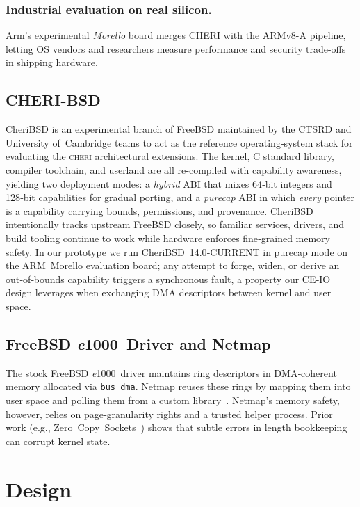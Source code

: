\documentclass[sigconf]{acmart}
\newcommand{\cheri}{\textsc{cheri}\xspace}
\newcommand{\e}{\textit{e}1000\xspace}
\begin{document}
\subsubsection{Industrial evaluation on real silicon.}
Arm’s experimental \textit{Morello} board merges CHERI with the ARMv8-A pipeline, letting OS vendors and researchers measure performance and security trade-offs in shipping hardware.






\subsection{CHERI-BSD}
CheriBSD is an experimental branch of FreeBSD maintained by the CTSRD and University of Cambridge teams to act as the reference operating‑system stack for evaluating the \cheri architectural extensions. The kernel, C standard library, compiler toolchain, and userland are all re‑compiled with capability awareness, yielding two deployment modes: a \emph{hybrid} ABI that mixes 64‑bit integers and 128‑bit capabilities for gradual porting, and a \emph{purecap} ABI in which \emph{every} pointer is a capability carrying bounds, permissions, and provenance. CheriBSD intentionally tracks upstream FreeBSD closely, so familiar services, drivers, and build tooling continue to work while hardware enforces fine‑grained memory safety. In our prototype we run CheriBSD 14.0‑CURRENT in purecap mode on the ARM Morello evaluation board; any attempt to forge, widen, or derive an out‑of‑bounds capability triggers a synchronous fault, a property our CE‑IO design leverages when exchanging DMA descriptors between kernel and user space.

\subsection{FreeBSD \e Driver and Netmap}
The stock FreeBSD \e driver maintains ring descriptors in DMA‑coherent memory allocated via \texttt{bus\_dma}. Netmap reuses these rings by mapping them into user space and polling them from a custom library \cite{rizzo2012netmap}. Netmap’s memory safety, however, relies on page‑granularity rights and a trusted helper process. Prior work (e.g., Zero Copy Sockets \cite{freebsdZC}) shows that subtle errors in length bookkeeping can corrupt kernel state.  




\section{Design}
\label{sec:design}
\end{document}
